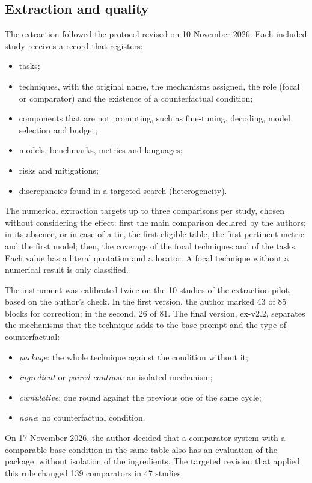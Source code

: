 \subsection{Extraction and quality}\label{sec:extracao}
The extraction followed the protocol revised on 10 November 2026. Each included study receives a record that registers:
\begin{itemize}
  \item tasks;
  \item techniques, with the original name, the mechanisms assigned, the role (focal or comparator) and the existence
  of a counterfactual condition;
  \item components that are not prompting, such as fine-tuning, decoding, model selection and budget;
  \item models, benchmarks, metrics and languages;
  \item risks and mitigations;
  \item discrepancies found in a targeted search (heterogeneity).
\end{itemize}
The numerical extraction targets up to three comparisons per study, chosen without considering the effect: first the
main comparison declared by the authors; in its absence, or in case of a tie, the first eligible table, the
first pertinent metric and the first model; then, the coverage of the focal techniques and of the tasks. Each value
has a literal quotation and a locator. A focal technique without a numerical result is only classified.

The instrument was calibrated twice on the 10 studies of the extraction pilot, based on the author's check. In the
first version, the author marked 43 of 85 blocks for correction; in the second, 26 of 81. The final version, ex-v2.2,
separates the mechanisms that the technique adds to the base prompt and the type of counterfactual:
\begin{itemize}
  \item \textit{package}: the whole technique against the condition without it;
  \item \textit{ingredient} or \textit{paired contrast}: an isolated mechanism;
  \item \textit{cumulative}: one round against the previous one of the same cycle;
  \item \textit{none}: no counterfactual condition.
\end{itemize}
On 17 November 2026, the author decided that a comparator system with a comparable base condition in the same table also
has an evaluation of the package, without isolation of the ingredients. The targeted revision that applied this rule changed 139
comparators in 47 studies.

